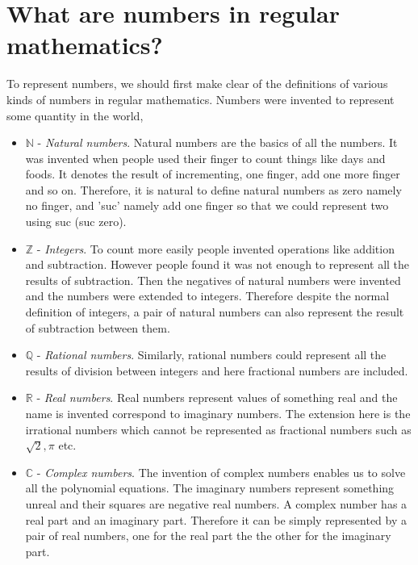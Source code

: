 \documentclass{article}
\theoremstyle{definition}
\begin{document}
\section{What are numbers in regular mathematics?}
To represent numbers, we should first make clear of the definitions of various kinds of numbers in regular mathematics. Numbers were invented to represent some quantity in the world,

\begin{itemize}
\item $\mathds{N}$ - \textit{Natural numbers}. Natural numbers are the basics of all the numbers. It was invented when people used their finger to count things like days and foods. It denotes the result of incrementing, one finger, add one more finger and so on. Therefore, it is natural to define natural numbers as zero namely no finger, and 'suc' namely add one finger so that we could represent two using suc (suc zero).

\item $\mathds{Z}$ - \textit{Integers}. To count more easily people invented operations like addition and subtraction. However people found it was not enough to represent all the results of subtraction. Then the negatives of natural numbers were invented and the numbers were extended to integers. Therefore despite the normal definition of integers, a pair of natural numbers can also represent the result of subtraction between them.

\item $\mathds{Q}$ - \textit{Rational numbers}. Similarly, rational numbers could represent all the results of division between integers and here fractional numbers are included.

\item $\mathds{R}$ - \textit{Real numbers}. Real numbers represent values of something real and the name is invented correspond to imaginary numbers. The extension here is the irrational numbers which cannot be represented as fractional numbers such as $\sqrt{2}, \pi$ etc.

\item $\mathds{C}$ - \textit{Complex numbers}. The invention of complex numbers enables us to solve all the polynomial equations. The imaginary numbers represent something unreal and their squares are negative real numbers. A complex number has a real part and an imaginary part. Therefore it can be simply represented by a pair of real numbers, one for the real part the the other for the imaginary part.
	
\end{itemize} 
\end{document}
